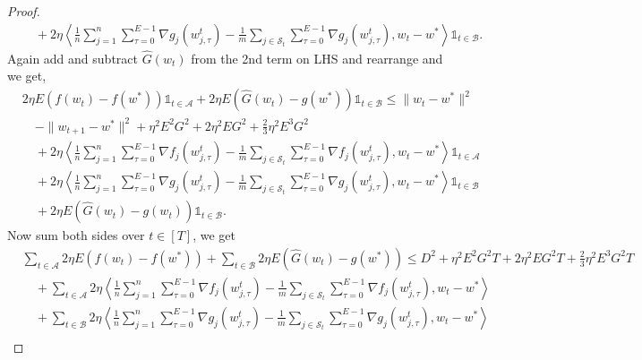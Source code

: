 \documentclass{article} %
\def\A{{\mathcal A}}
\def\B{{\mathcal B}}
\def\S{{\mathcal S}}
\begin{document}
\begin{proof}
\begin{equation*}
\begin{aligned}
        &\quad + 2\eta \left\langle \frac{1}{n} \sum_{j=1}^{n} \sum_{\tau=0}^{E-1} \nabla g_j(w_{j,\tau}^t) 
        - \frac{1}{m} \sum_{j \in \S_t} \sum_{\tau=0}^{E-1} \nabla g_j(w_{j,\tau}^t), w_t - w^* \right\rangle \mathds{1}_{t \in \B}.
    \end{aligned}
    \end{equation*}
    Again add and subtract $\hat{G}(w_t)$ from the 2nd term on LHS and rearrange and we get,
    \begin{equation*}
    \begin{aligned}
        &2\eta E(f(w_t) - f(w^*) )\mathds{1}_{t \in \A} + 2\eta E(\hat{G}(w_t) - g(w^*))\mathds{1}_{t \in \B} \leq \|w_t - w^*\|^2 
        \\
        & \quad - \|w_{t+1} - w^*\|^2 + \eta^2E^2G^2 + 2\eta^2EG^2 + \frac{2}{3}\eta^2 E^3G^2 
        \\
        &\quad + 2\eta \left\langle \frac{1}{n} \sum_{j=1}^{n} \sum_{\tau=0}^{E-1} \nabla f_j(w_{j,\tau}^t) 
        - \frac{1}{m} \sum_{j \in \S_t} \sum_{\tau=0}^{E-1} \nabla f_j(w_{j,\tau}^t), w_t - w^* \right\rangle \mathds{1}_{t \in \A} \\
        &\quad + 2\eta \left\langle \frac{1}{n} \sum_{j=1}^{n} \sum_{\tau=0}^{E-1} \nabla g_j(w_{j,\tau}^t) 
        - \frac{1}{m} \sum_{j \in \S_t} \sum_{\tau=0}^{E-1} \nabla g_j(w_{j,\tau}^t), w_t - w^* \right\rangle \mathds{1}_{t \in \B}
        \\
        &\quad + 2\eta E(\hat{G}(w_t) - g(w_t))\mathds{1}_{t \in \B}.
    \end{aligned}
    \end{equation*}
    Now sum both sides over $t \in [T]$, we get
    \begin{equation*}
    \begin{aligned}
        &\sum_{t \in \A}2\eta E(f(w_t) - f(w^*) ) + \sum_{t \in \B} 2\eta E(\hat{G}(w_t) - g(w^*)) \leq D^2 + \eta^2E^2G^2T + 2\eta^2EG^2T + \frac{2}{3}\eta^2 E^3G^2T 
        \\
        &\quad + \sum_{t \in \A}2\eta \left\langle \frac{1}{n} \sum_{j=1}^{n} \sum_{\tau=0}^{E-1} \nabla f_j(w_{j,\tau}^t) 
        - \frac{1}{m} \sum_{j \in \S_t} \sum_{\tau=0}^{E-1} \nabla f_j(w_{j,\tau}^t), w_t - w^* \right\rangle  \\
        &\quad + \sum_{t \in \B}2\eta \left\langle \frac{1}{n} \sum_{j=1}^{n} \sum_{\tau=0}^{E-1} \nabla g_j(w_{j,\tau}^t) 
        - \frac{1}{m} \sum_{j \in \S_t} \sum_{\tau=0}^{E-1} \nabla g_j(w_{j,\tau}^t), w_t - w^* \right\rangle
        \\

\end{aligned}
\end{equation*}
\end{proof}
\end{document}
